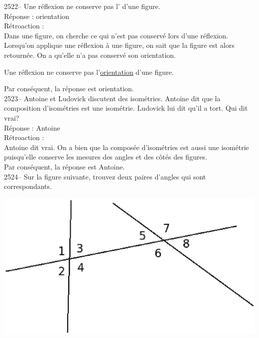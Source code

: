 \documentclass[letterpaper, 12pt]{article}
\begin{document}

2522-- Une r\'eflexion ne conserve pas l'\underline{\qquad\qquad} d'une figure.\\

R\'eponse : orientation\\

R\'etroaction :\\
Dans une figure, on cherche ce qui n'est pas conserv\'e lors d'une r\'eflexion. Lorsqu'on applique une r\'eflexion \`a une figure, on sait que la figure est alors retourn\'ee. On a qu'elle n'a pas conserv\'e son orientation.
\begin{center}
Une r\'eflexion ne conserve pas l'\underline{orientation} d'une figure.\\
\end{center}
Par cons\'equent, la r\'eponse est orientation.\\

2523-- Antoine et Ludovick discutent des isom\'etries. Antoine dit que la composition d'isom\'etries est une isom\'etrie. Ludovick lui dit qu'il a tort. Qui dit vrai? \\

R\'eponse : Antoine\\

R\'etroaction :\\
Antoine dit vrai. On a bien que la compos\'ee d'isom\'etries est aussi une isom\'etrie puisqu'elle conserve les mesures des angles et des c\^ot\'es des figures.\\
Par cons\'equent, la r\'eponse est Antoine.\\


2524-- Sur la figure suivante, trouvez deux paires d'angles qui sont correspondants.\\
\begin{center}
 \includegraphics[width=8 cm,bb=0 474 591 842]{Q2524.eps}
\end{center}
\end{document}
